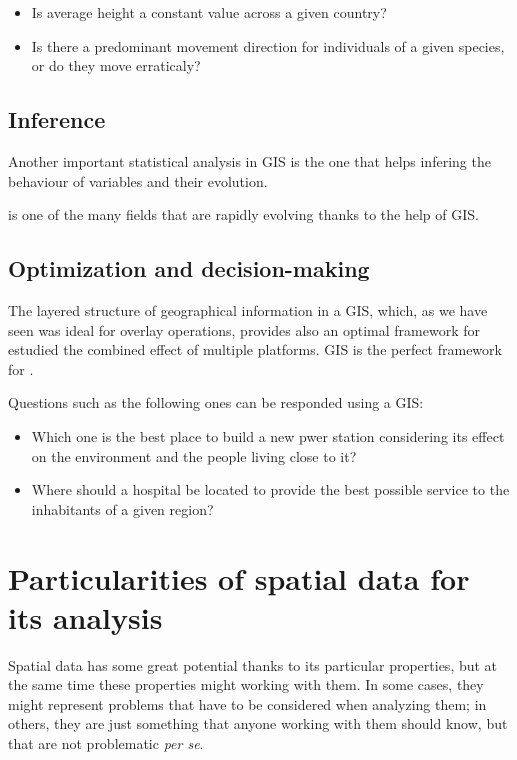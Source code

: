 \begin{itemize}
\item Is average height a constant value across a given country?

\item Is there a predominant movement direction for individuals of a given species, or do they move erraticaly?
\end{itemize}

\subsection{Inference}

Another important statistical analysis in GIS is the one that helps infering the behaviour of variables and their evolution.

 is one of the many fields that are rapidly evolving thanks to the help of GIS.

\subsection{Optimization and decision-making}

The layered structure of geographical information in a GIS, which, as we have seen was ideal for overlay operations, provides also an optimal framework for estudied the combined effect of multiple platforms. GIS is the perfect framework for .

Questions such as the following ones can be responded using a GIS:

\begin{itemize}
\item Which one is the best place to build a new pwer station considering its effect on the environment and the people living close to it?

\item Where should a hospital be located to provide the best possible service to the inhabitants of a given region?
\end{itemize}


\section{Particularities of spatial data for its analysis}

Spatial data has some great potential thanks to its particular properties, but at the same time these properties might  working with them. In some cases, they might represent problems that have to be considered when analyzing them; in others, they are just something that anyone working with them should know, but that are not problematic \emph{per se}.

